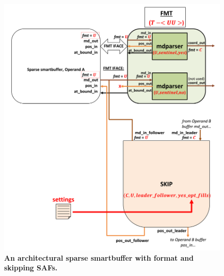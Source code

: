 \begin{figure}[ht]
\includegraphics[width=\textwidth]{figures/safinference_build_10skipoptfillscust.png}
\caption{\textbf{An architectural sparse smartbuffer with format and skipping SAFs.}}
\label{fig:safinference_build_10skipoptfillscust}
\centering
\end{figure}




